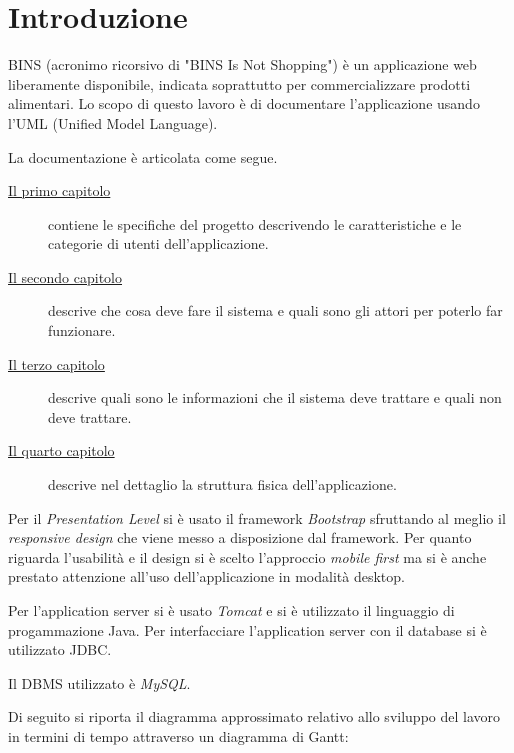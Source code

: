 
\cleardoublepage
{}

\chapter*{Introduzione}

BINS (acronimo ricorsivo di "BINS Is Not Shopping") è un applicazione web liberamente disponibile, indicata soprattutto per commercializzare prodotti alimentari. Lo scopo di questo lavoro è di documentare l'applicazione usando l'UML (Unified Model Language).

La documentazione è articolata come segue.

\begin{description}
	\item[{\hyperref[cap:specifiche-progetto]{Il primo capitolo}}]
	contiene le specifiche del progetto descrivendo le caratteristiche e le categorie di utenti dell'applicazione.
	\item[{\hyperref[cap:modello-casi-d'uso]{Il secondo capitolo}}]
	descrive che cosa deve fare il sistema e quali sono gli attori per poterlo far funzionare.
	\item[{\hyperref[cap:modello-del-dominio]{Il terzo capitolo}}]
	descrive quali sono le informazioni che il sistema deve trattare e quali non deve trattare.
	\item[{\hyperref[cap:modello-di-design]{Il quarto capitolo}}]
	descrive nel dettaglio la struttura fisica dell'applicazione.
\end{description}

Per il \emph{Presentation Level} si è usato il framework \emph{Bootstrap} sfruttando al meglio il \emph{responsive design} che viene messo a disposizione dal framework. Per quanto riguarda l'usabilità e il design si è scelto l'approccio \emph{mobile first} ma si è anche prestato attenzione all'uso dell'applicazione in modalità desktop.

Per l'application server si è usato \emph{Tomcat} e si è utilizzato il linguaggio di progammazione Java.
 Per interfacciare l'application server con il database si è utilizzato JDBC.
 
Il DBMS utilizzato è \emph{MySQL}.

Di seguito si riporta il diagramma approssimato relativo allo sviluppo del lavoro in termini di tempo attraverso un diagramma di Gantt: